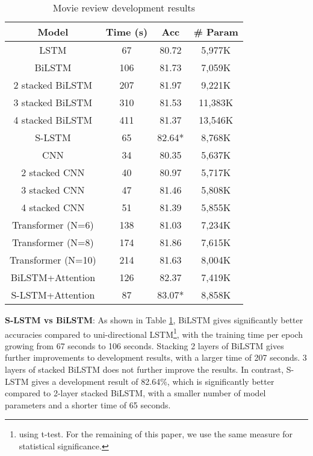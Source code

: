 \documentclass[11pt,a4paper]{article}
\begin{document}
\begin{table}[t]
	\centering
	\tabcolsep=0.1cm
	\begin{tabular}{|ccc|ccc|}
		\hline
		\multicolumn{3}{|c|}{\textbf{Model}}& \textbf{Time (s)} & \textbf{Acc} & \textbf{\# Param}\\ 
		\hline 	
		\multicolumn{3}{|c|}{LSTM}&67&80.72 &5,977K\\
		\multicolumn{3}{|c|}{BiLSTM}&106&81.73 &7,059K\\ 
		\multicolumn{3}{|c|}{2 stacked BiLSTM}&207&81.97&9,221K\\ 
		\multicolumn{3}{|c|}{3 stacked BiLSTM}&310&81.53 &11,383K\\
		\multicolumn{3}{|c|}{4 stacked BiLSTM}&411&81.37 &13,546K\\ 
		\multicolumn{3}{|c|}{S-LSTM}&65&82.64* &8,768K\\         
		\hline
		\multicolumn{3}{|c|}{CNN}&34&80.35&5,637K\\ 
        \multicolumn{3}{|c|}{2 stacked CNN}&40&80.97 &5,717K\\  
        \multicolumn{3}{|c|}{3 stacked CNN}&47&81.46 &5,808K\\  
        \multicolumn{3}{|c|}{4 stacked CNN}&51&81.39 &5,855K\\  
        \hline 	
		\multicolumn{3}{|c|}{Transformer (N=6)}&138&81.03&7,234K\\ 
        \multicolumn{3}{|c|}{Transformer (N=8)}&174&81.86 &7,615K\\  
        \multicolumn{3}{|c|}{Transformer (N=10)}&214&81.63 &8,004K\\  
		\hline 	
		\multicolumn{3}{|c|}{BiLSTM+Attention}&126&82.37 &7,419K\\
		\multicolumn{3}{|c|}{S-LSTM+Attention}&87&83.07* &8,858K\\
		\hline
	\end{tabular}
	\caption{\label{tab:movie_dev_2}Movie review development results}
\end{table}


\textbf{S-LSTM vs BiLSTM}: As shown in Table \ref{tab:movie_dev_2}, BiLSTM gives significantly better accuracies compared to uni-directional LSTM\footnote{ using t-test. For the remaining of this paper, we use the same measure for statistical significance.}, with the training time per epoch growing from 67 seconds to 106 seconds. 
Stacking 2 layers of BiLSTM gives further improvements to development results, with a larger time of 207 seconds. 
3 layers of stacked BiLSTM does not further improve the results.
In contrast, S-LSTM gives a development result of 82.64\%, which is significantly better compared to 2-layer stacked BiLSTM, with a smaller number of model parameters and a shorter time of 65 seconds.
\end{document}
